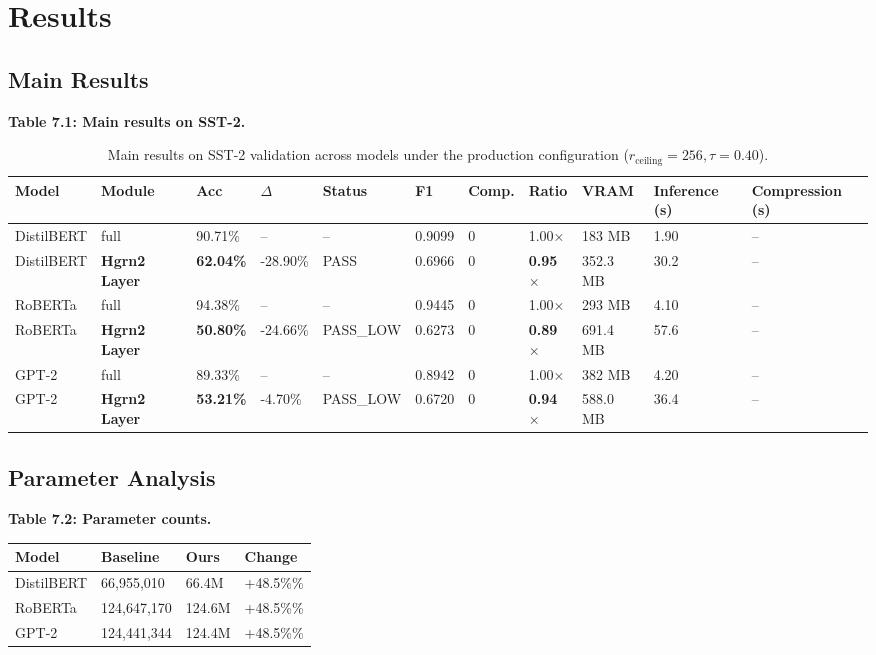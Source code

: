 \section{Results}

\subsection{Main Results}

\textbf{Table 7.1: Main results on SST-2.}

\begin{table}[t]
\centering
\small
\begin{tabular}{lllllllllll}
\toprule
\textbf{Model} & \textbf{Module} & \textbf{Acc} & \textbf{$\Delta$} & \textbf{Status} & \textbf{F1} & \textbf{Comp.} & \textbf{Ratio} & \textbf{VRAM} & \textbf{Inference (s)} & \textbf{Compression (s)} \\
\midrule
DistilBERT & full & 90.71\% & -- & -- & 0.9099 & 0 & 1.00$\times$ & 183 MB & 1.90 & -- \\
DistilBERT & \textbf{Hgrn2 Layer} & \textbf{62.04\%} & -28.90\% & PASS & 0.6966 & 0 & \textbf{0.95$\times$} & 352.3 MB & 30.2 & -- \\
RoBERTa & full & 94.38\% & -- & -- & 0.9445 & 0 & 1.00$\times$ & 293 MB & 4.10 & -- \\
RoBERTa & \textbf{Hgrn2 Layer} & \textbf{50.80\%} & -24.66\% & PASS\_LOW & 0.6273 & 0 & \textbf{0.89$\times$} & 691.4 MB & 57.6 & -- \\
GPT-2 & full & 89.33\% & -- & -- & 0.8942 & 0 & 1.00$\times$ & 382 MB & 4.20 & -- \\
GPT-2 & \textbf{Hgrn2 Layer} & \textbf{53.21\%} & -4.70\% & PASS\_LOW & 0.6720 & 0 & \textbf{0.94$\times$} & 588.0 MB & 36.4 & -- \\
\bottomrule
\end{tabular}
\caption{Main results on SST-2 validation across models under the production configuration ($r_{\mathrm{ceiling}}=256, \tau=0.40$).}
\label{tab:main_sst2}
\end{table}

\subsection{Parameter Analysis}

\textbf{Table 7.2: Parameter counts.}

\begin{table}[H]
\centering
\small
\begin{tabular}{llll}
\toprule
\textbf{Model} & \textbf{Baseline} & \textbf{Ours} & \textbf{Change} \\
\midrule
DistilBERT & 66,955,010 & 66.4M & +48.5\%\% \\
RoBERTa & 124,647,170 & 124.6M & +48.5\%\% \\
GPT-2 & 124,441,344 & 124.4M & +48.5\%\% \\
\bottomrule
\end{tabular}
\end{table}

